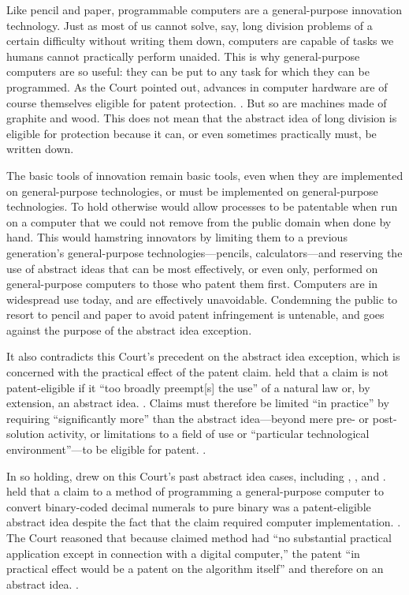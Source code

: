 \documentclass{scotus}
\begin{document}
Like pencil and paper, programmable computers are a general-purpose innovation
technology.  Just as most of us cannot solve, say, long division problems of a
certain difficulty without writing them down, computers are capable of tasks we
humans cannot practically perform unaided.  This is why general-purpose
computers are so useful:  they can be put to any task for which they can be
programmed.  As the Court pointed out, advances in computer hardware are of
course themselves eligible for patent protection.  .
But so are machines made of graphite and wood.  This does not mean that the
abstract idea of long division is eligible for protection because it can, or
even sometimes practically must, be written down.

The basic tools of innovation remain basic tools, even when they are implemented
on general-purpose technologies, or must be implemented on general-purpose
technologies.  To hold otherwise would allow processes to be patentable when run
on a computer that we could not remove from the public domain when done by hand.
This would hamstring innovators by limiting them to a previous generation’s
general-purpose technologies—pencils, calculators—and reserving the use of
abstract ideas that can be most effectively, or even only, performed on
general-purpose computers to those who patent them first.  Computers are in
widespread use today, and are effectively unavoidable. Condemning the public to
resort to pencil and paper to avoid patent infringement is untenable, and goes
against the purpose of the abstract idea exception.

It also contradicts this Court’s precedent on the abstract idea exception, which
is concerned with the practical effect of the patent claim.   held
that a claim is not patent-eligible if it “too broadly preempt[s] the use” of a
natural law or, by extension, an abstract idea. .
Claims must therefore be limited “in practice” by requiring “significantly more”
than the abstract idea—beyond mere pre- or post-solution activity, or
limitations to a field of use or “particular technological environment”—to be
eligible for patent.  . 

%
In so holding,  drew on this Court’s past abstract idea cases,
including , , and .
 held that a claim to a method of programming a
general-purpose computer to convert binary-coded decimal numerals to pure binary
was a patent-eligible abstract idea despite the fact that the claim required
computer implementation.  .  The Court reasoned that
because claimed method had “no substantial practical application except in
connection with a digital computer,” the patent “in practical effect would be a
patent on the algorithm itself” and therefore on an abstract idea.
.  
\end{document}
